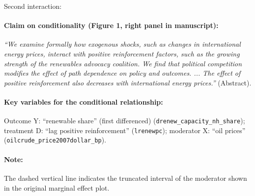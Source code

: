 \documentclass[12pt]{article}
\begin{document}
\noindent Second interaction:

\paragraph{Claim on conditionality (Figure 1, right panel in manuscript):} \emph{``We examine formally how exogenous shocks, such as changes in international energy prices, interact with positive reinforcement factors, such as the growing strength of the renewables advocacy coalition. We find that political competition modifies the effect of path dependence on policy and outcomes. ... The effect of positive reinforcement also decreases with international energy prices.''} (Abstract). 

\paragraph{Key variables for the conditional relationship:} Outcome Y:
``renewable share'' (first differenced) (\texttt{drenew\_capacity\_nh\_share}); treatment D:  ``lag positive reinforcement'' (\texttt{lrenewpc}); moderator X: ``oil prices'' (\texttt{oilcrude\_price2007dollar\_bp}). 

\paragraph{Note:}  The dashed vertical line indicates the truncated interval of the moderator shown in the original marginal effect plot.
\clearpage
\end{document}
